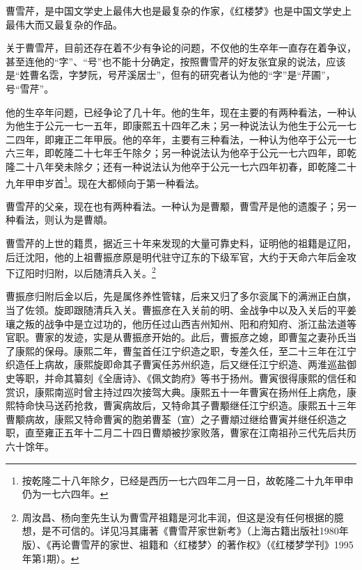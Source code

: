 \par 曹雪芹，是中国文学史上最伟大也是最复杂的作家，《红楼梦》也是中国文学史上最伟大而又最复杂的作品。
\par 关于曹雪芹，目前还存在着不少有争论的问题，不仅他的生卒年一直存在着争议，甚至连他的“字”、“号”也不能十分确定，按照曹雪芹的好友张宜泉的说法，应该是“姓曹名霑，字梦阮，号芹溪居士”，但有的研究者认为他的“字”是“芹圃”，号“雪芹”。
\par 他的生卒年问题，已经争论了几十年。他的生年，现在主要的有两种看法，一种认为他生于公元一七一五年，即康熙五十四年乙未；另一种说法认为他生于公元一七二四年，即雍正二年甲辰。他的卒年，主要有三种看法，一种认为他卒于公元一七六三年，即乾隆二十七年壬午除夕；另一种说法认为他卒于公元一七六四年，即乾隆二十八年癸未除夕；还有一种说法认为他卒于公元一七六四年初春，即乾隆二十九年甲申岁首\footnote{按乾隆二十八年除夕，已经是西历一七六四年二月一日，故乾隆二十九年甲申仍为一七六四年。}。现在大都倾向于第一种看法。
\par 曹雪芹的父亲，现在也有两种看法。一种认为是曹颙，曹雪芹是他的遗腹子；另一种看法，则认为是曹頫。
\par 曹雪芹的上世的籍贯，据近三十年来发现的大量可靠史料，证明他的祖籍是辽阳，后迁沈阳，他的上祖曹振彦原是明代驻守辽东的下级军官，大约于天命六年后金攻下辽阳时归附，以后随清兵入关。\footnote{周汝昌、杨向奎先生认为曹雪芹祖籍是河北丰润，但这是没有任何根据的臆想，是不可信的。详见冯其庸著《曹雪芹家世新考》（上海古籍出版社1980年版）、《再论曹雪芹的家世、祖籍和〈红楼梦〉的著作权》（《红楼梦学刊》1995年第1期）。}
\par 曹振彦归附后金以后，先是属佟养性管辖，后来又归了多尔衮属下的满洲正白旗，当了佐领。旋即跟随清兵入关。曹振彦在入关前的明、金战争中以及入关后的平姜瓖之叛的战争中是立过功的，他历任过山西吉州知州、阳和府知府、浙江盐法道等官职。曹家的发迹，实是从曹振彦开始的。此后，曹振彦之媳，即曹玺之妻孙氏当了康熙的保母。康熙二年，曹玺首任江宁织造之职，专差久任，至二十三年在江宁织造任上病故，康熙旋即命其子曹寅任苏州织造，后又继任江宁织造、两淮巡盐御史等职，并命其纂刻《全唐诗》、《佩文韵府》等书于扬州。曹寅很得康熙的信任和赏识，康熙南巡时曾主持过四次接驾大典。康熙五十一年曹寅在扬州任上病危，康熙特命快马送药抢救，曹寅病故后，又特命其子曹颙继任江宁织造。康熙五十三年曹颙病故，康熙又特命曹寅的胞弟曹荃（宣）之子曹頫过继给曹寅并继任织造之职，直至雍正五年十二月二十四日曹頫被抄家败落，曹家在江南祖孙三代先后共历六十馀年。
